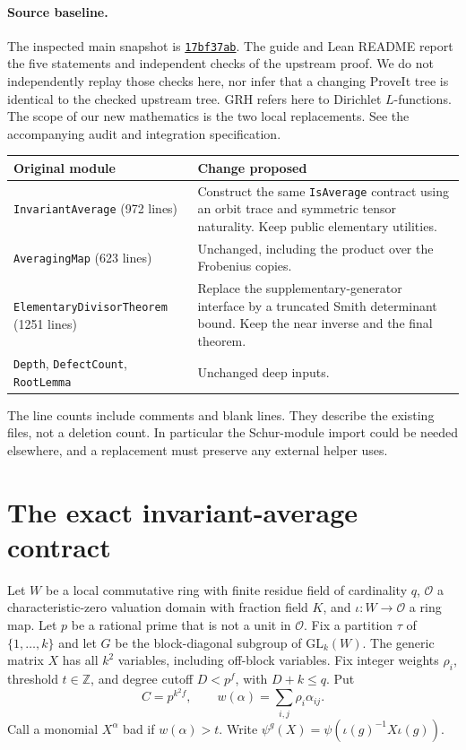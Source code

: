 \documentclass[11pt]{article}
\newcommand{\OO}{\mathcal O}
\newcommand{\src}[1]{\texttt{#1}}
\begin{document}
\paragraph{Source baseline.} The inspected main snapshot is \href{https://github.com/VladimirReshetnikov/ProveIt/tree/17bf37ab3b6740d5d7430065d2f2a1a2a03e8a0e/Analysis/GeneralizedRiemannHypothesis}{\texttt{17bf37ab}}. The guide and Lean README report the five statements and independent checks of the upstream proof. We do not independently replay those checks here, nor infer that a changing ProveIt tree is identical to the checked upstream tree. GRH refers here to Dirichlet $L$-functions. The scope of our new mathematics is the two local replacements. See the accompanying audit and integration specification.

\begin{center}
\small
\begin{tabular}{p{.29\linewidth}p{.58\linewidth}}
\toprule
Original module & Change proposed \\
\midrule
\src{InvariantAverage} (972 lines) & Construct the same \src{IsAverage} contract using an orbit trace and symmetric tensor naturality. Keep public elementary utilities.\\
\src{AveragingMap} (623 lines) & Unchanged, including the product over the Frobenius copies.\\
\src{ElementaryDivisorTheorem} (1251 lines) & Replace the supplementary-generator interface by a truncated Smith determinant bound. Keep the near inverse and the final theorem.\\
\src{Depth}, \src{DefectCount}, \src{RootLemma} & Unchanged deep inputs.\\
\bottomrule
\end{tabular}
\end{center}
The line counts include comments and blank lines. They describe the existing files, not a deletion count. In particular the Schur-module import could be needed elsewhere, and a replacement must preserve any external helper uses.

\section{The exact invariant-average contract}
Let $W$ be a local commutative ring with finite residue field of cardinality $q$, $\OO$ a characteristic-zero valuation domain with fraction field $K$, and $\iota:W\to\OO$ a ring map. Let $p$ be a rational prime that is not a unit in $\OO$. Fix a partition $\tau$ of $\{1,\ldots,k\}$ and let $G$ be the block-diagonal subgroup of $\mathrm{GL}_k(W)$. The generic matrix $X$ has all $k^2$ variables, including off-block variables. Fix integer weights $\rho_i$, threshold $t\in\mathbb Z$, and degree cutoff $D<p^f$, with $D+k\le q$. Put
\[
  C=p^{k^2 f},\qquad w(\alpha)=\sum_{i,j}\rho_i\alpha_{ij}.
\]
Call a monomial $X^\alpha$ bad if $w(\alpha)>t$. Write $\psi^g(X)=\psi(\iota(g)^{-1}X\iota(g))$.
\end{document}
